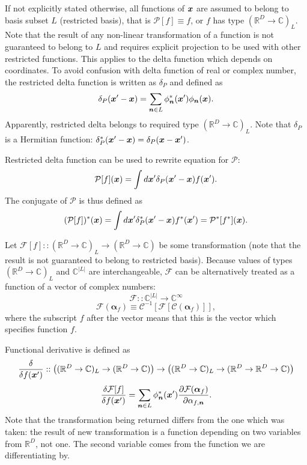 If not explicitly stated otherwise, all functions of $\boldsymbol{x}$ are assumed to belong to basis subset $L$ (restricted basis),
that is $\mathcal{P}[f] \equiv f$, or $f$ has type $(\mathbb{R}^D \rightarrow \mathbb{C})_L$.
Note that the result of any non-linear transformation of a function is not guaranteed to belong to $L$ and requires explicit projection to be used with other restricted functions.
This applies to the delta function which depends on coordinates.
To avoid confusion with delta function of real or complex number,
the restricted delta function is written as $\delta_P$ and defined as
\begin{equation}
\label{eqn:formalism:func-calculus:restricted-delta}
	\delta_P(\boldsymbol{x}^\prime - \boldsymbol{x})
	= \sum_{\boldsymbol{n} \in L} \phi_{\boldsymbol{n}}^* (\boldsymbol{x}^\prime) \phi_{\boldsymbol{n}} (\boldsymbol{x}).
\end{equation}
Apparently, restricted delta belongs to required type $(\mathbb{R}^D \rightarrow \mathbb{C})_L$.
Note that $\delta_P$ is a Hermitian function: $\delta_P^*(\boldsymbol{x}^\prime - \boldsymbol{x}) = \delta_P(\boldsymbol{x} - \boldsymbol{x}^\prime)$.

Restricted delta function can be used to rewrite equation for $\mathcal{P}$:
\[
	\mathcal{P}[f](\boldsymbol{x}) = \int d\boldsymbol{x}^\prime \delta_P(\boldsymbol{x}^\prime - \boldsymbol{x}) f(\boldsymbol{x}^\prime).
\]
The conjugate of $\mathcal{P}$ is thus defined as
\[
	(\mathcal{P}[f])^*(\boldsymbol{x})
	= \int d\boldsymbol{x}^\prime \delta_P^*(\boldsymbol{x}^\prime - \boldsymbol{x}) f^*(\boldsymbol{x}^\prime)
	= \mathcal{P}^* [f^*](\boldsymbol{x}).
\]

Let $\mathcal{F}[f] :: (\mathbb{R}^D \rightarrow \mathbb{C})_L \rightarrow (\mathbb{R}^D \rightarrow \mathbb{C})$ be some transformation
(note that the result is not guaranteed to belong to restricted basis).
Because values of types $(\mathbb{R}^D \rightarrow \mathbb{C})_L$ and $\mathbb{C}^{|L|}$ are interchangeable,
$\mathcal{F}$ can be alternatively treated as a function of a vector of complex numbers:
\[
	\mathcal{F} :: \mathbb{C}^{|L|} \rightarrow \mathbb{C}^\infty
\]
\[
	\mathcal{F}(\bm{\alpha}_f) \equiv \mathcal{C}^{-1}[\mathcal{F}[\mathcal{C}(\bm{\alpha}_f)]],
\]
where the subscript $f$ after the vector means that this is the vector which specifies function $f$.

Functional derivative is defined as
\[
	\frac{\delta}{\delta f(\boldsymbol{x}^\prime)} ::
	\left(
		(\mathbb{R}^D \rightarrow \mathbb{C})_L
		\rightarrow
		(\mathbb{R}^D \rightarrow \mathbb{C})
	\right)
	\rightarrow
	\left(
		(\mathbb{R}^D \rightarrow \mathbb{C})_L
		\rightarrow
		(\mathbb{R}^D \rightarrow \mathbb{R}^D \rightarrow \mathbb{C})
	\right)
\]
\begin{equation}
\label{eqn:formalism:func-aux:func-diff}
	\frac{\delta \mathcal{F}[f]}{\delta f(\boldsymbol{x}^\prime)}
	= \sum_{\boldsymbol{n} \in L} \phi_{\boldsymbol{n}}^* (\boldsymbol{x}^\prime)
		\frac{\partial \mathcal{F}(\bm{\alpha}_f)}{\partial \alpha_{f,\boldsymbol{n}}}.
\end{equation}
Note that the transformation being returned differs from the one which was taken:
the result of new transformation is a function depending on two variables from $\mathbb{R}^D$, not one.
The second variable comes from the function we are differentiating by.

